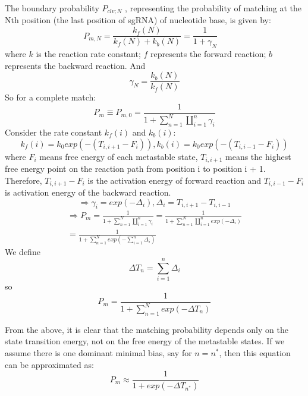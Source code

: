 The boundary probability $P_{clv;N}$ , representing the probability of matching at the Nth position (the last position of sgRNA) of nucleotide base, is given by:
\begin{equation}
P_{m,N}=\frac{k_f(N)}{k_f(N)+k_b(N)}=\frac{1}{1+\gamma_N} \quad
\end{equation}
where $k$ is the reaction rate constant; $f$ represents the forward reaction; $b$ represents the backward reaction. And 
\begin{equation}
 \gamma_N=\frac{k_b(N)}{k_f(N)}
\end{equation}
So for a complete match: 
\begin{equation}
P_{m} \equiv P_{m,0} = \frac{1}{1+\sum_{n=1}^N\coprod_{i=1}^n \gamma_i}
\end{equation}
Consider the rate constant $k_f(i)$ and $k_b(i)$:
\begin{equation}
k_f(i)=k_0exp(-(T_{i,i+1}-F_i)),k_b(i)=k_0exp(-(T_{i,i-1}-F_i))
\end{equation}
where $F_i$ means free energy of each metastable state, $T_{i,i+1}$ means the highest free energy point on the reaction path from position i to position i + 1. Therefore, $T_{i,i+1}-F_i$ is the activation energy of forward reaction and $T_{i,i-1}-F_i$ is activation energy of the backward reaction.
\begin{equation}
\Rightarrow \gamma_i=exp(-\Delta_i), \Delta_i=T_{i,i+1}-T_{i,i-1}
\end{equation}
\begin{equation}
\begin{aligned}
\Rightarrow P_{m} = \frac{1}{1+\sum_{n=1}^N\coprod_{i=1}^n \gamma_i}=\frac{1}{1+\sum_{n=1}^N\coprod_{i=1}^n exp(-\Delta_i)}\\=\frac{1}{1+\sum_{n=1}^N exp(-\sum_{i=1}^n\Delta_i)}
\end{aligned}
\end{equation}
We define $$\Delta T_n=\sum_{i=1}^n\Delta_i$$
so
\begin{equation} 
P_{m} =\frac{1}{1+\sum_{n=1}^N exp(-\Delta T_n)}
\end{equation}
	
From the above, it is clear that the matching probability depends only on the state transition energy, not on the free energy of the metastable states. If we assume there is one dominant minimal bias, say for $n = n^*$, then this equation can be approximated as:
\begin{equation}
 P_{m} \approx \frac{1}{1+exp(-\Delta T_{n^*})}
\end{equation}

